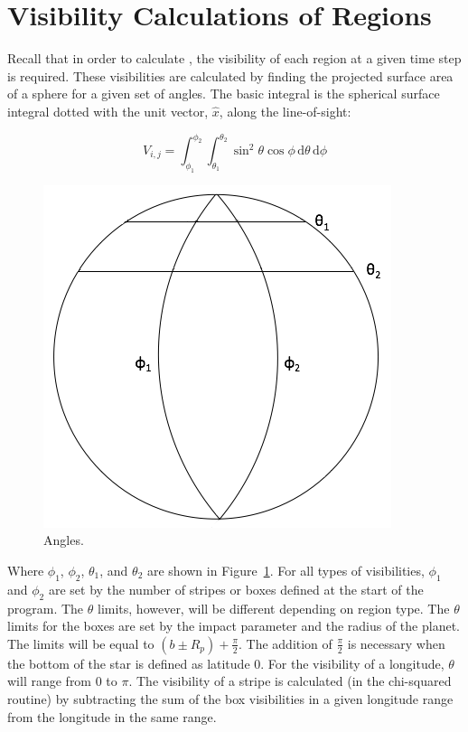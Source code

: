 

\section{Visibility Calculations of Regions \label{vis}}
Recall that in order to calculate \fmod, the visibility of each region at a given time step is required. These visibilities are calculated by finding the projected surface area of a sphere for a given set of angles. The basic integral is the spherical surface integral dotted with the unit vector, $\hat{x}$, along the line-of-sight:

\begin{equation}
	V_{i,j} = \int_{\phi_1}^{\phi_2} \int_{\theta_1}^{\theta_2} \sin^2{\theta}\cos{\phi}\,\mathrm{d}\theta \, \mathrm{d}\phi
\end{equation}

\begin{figure}[h]
	\centering
	\includegraphics[width=.5\textwidth]{images/angles.png}
	\caption{Angles.}
	\label{angles}
\end{figure}

Where $\phi_1$, $\phi_2$, $\theta_1$, and $\theta_2$ are shown in Figure~\ref{angles}. For all types of visibilities, $\phi_1$ and $\phi_2$ are set by the number of stripes or boxes defined at the start of the program. The $\theta$ limits, however, will be different depending on region type.
The $\theta$ limits for the boxes are set by the impact parameter and the radius of the planet. The limits will be equal to $(b \pm R_p) + \frac{\pi}{2}$. The addition of $\frac{\pi}{2}$ is necessary when the bottom of the star is defined as latitude 0. For the visibility of a longitude, $\theta$ will range from 0 to $\pi$. The visibility of a stripe is calculated (in the chi-squared routine) by subtracting the sum of the box visibilities in a given longitude range from the longitude in the same range.